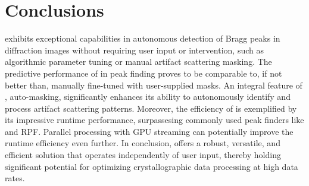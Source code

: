 \documentclass[a4paper]{article}
\begin{document}
\begin{table}[t]
\caption{
    The runtime performance of diffraction image analysis algorithms measured on
    Rayonix images containing 3.7 megapixels.  We measured runtime performance
    of \psocake{} and \peaknet{} directly using Rayonix images.  For reference
    purposes, we also included another peak finding method RPF
    \citep{hadian-jaziPeakfindingAlgorithmBased2017,
    hadian-jaziDataReductionSerial2021} and two classification methods for X-ray
    diffraction data reduction. RPF runtime performance was originally measured
    on AGIPD 1M \citep{allahgholiAdaptiveGainIntegrating2019}.  
}
\label{tb : runtime}
\centering
{}
\end{table}


\section{Conclusions}

\peaknet{} exhibits exceptional capabilities in autonomous detection of Bragg
peaks in diffraction images without requiring user input or intervention, such
as algorithmic parameter tuning or manual artifact scattering masking.  The
predictive performance of \peaknet{} in peak finding proves to be comparable to,
if not better than, manually fine-tuned \psocake{} with user-supplied masks.  An
integral feature of \peaknet{}, auto-masking, significantly enhances its ability
to autonomously identify and process artifact scattering patterns.  Moreover,
the efficiency of \peaknet{} is exemplified by its impressive runtime
performance, surpassesing commonly used peak finders like \psocake{} and RPF.
Parallel processing with GPU streaming can potentially improve the runtime
efficiency even further.  In conclusion, \peaknet{}  offers a robust, versatile,
and efficient solution that operates independently of user input, thereby
holding significant potential for optimizing crystallographic data processing at
high data rates.



\end{document}
